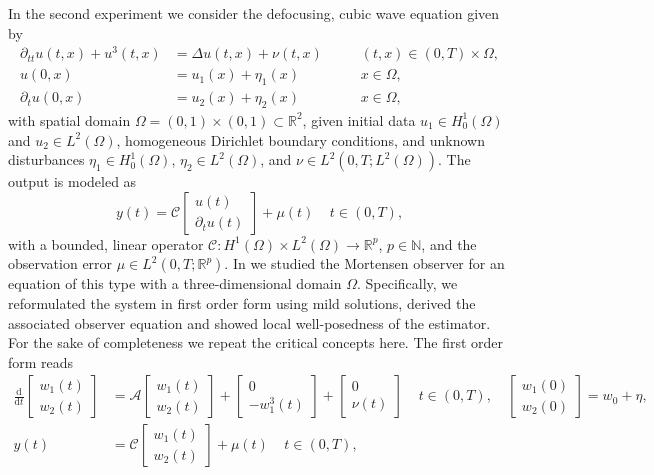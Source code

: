 \documentclass[11pt,reqno]{amsart}
\numberwithin{equation}{section}
\theoremstyle{plain}
\begin{document}
In the second experiment we consider the defocusing, cubic wave equation given by 
%
\begin{equation*}
\begin{aligned}
	\partial_{tt} {u}(t,x) + {u}^3(t,x) &= \Delta {u}(t,x) + \nu(t,x)
	~~~~~&&(t,x) \in (0,T) \times \Omega, \\
	{u}(0,x) &= u_1(x) + \eta_1(x)
	~~~~~&&x \in \Omega,\\
	\partial_t {u}(0,x) &= u_2(x) + \eta_2(x)
	~~~~~&&x \in \Omega,
\end{aligned}
\end{equation*}
%
with  spatial domain $\Omega = (0,1) \times (0,1) \subset \mathbb{R}^2$, given initial data $u_1 \in H^1_0(\Omega)$ and $u_2 \in L^2(\Omega)$, homogeneous Dirichlet boundary conditions, and unknown disturbances $\eta_1 \in H^1_0(\Omega)$, $\eta_2 \in L^2(\Omega)$, and $\nu \in L^2(0,T;L^2(\Omega))$. The output is modeled as 
%
\begin{equation*}
	y(t) = \mathcal{C} \begin{bmatrix} u(t) \\ \partial_t u(t) \end{bmatrix}
	+ \mu(t)
	~~~~~ t \in (0,T), 
\end{equation*}
%
with a bounded, linear operator $\mathcal{C} \colon H^1(\Omega) \times L^2(\Omega) \to \mathbb{R}^p$, $p \in \mathbb{N}$, and the observation error $\mu \in L^2(0,T;\mathbb{R}^p)$.
In \cite{Sch24} we studied the Mortensen observer for an equation of this type with a three-dimensional domain $\Omega$. Specifically, we reformulated the system in first order form using mild solutions, derived the associated observer equation and showed local well-posedness of the estimator.
For the sake of completeness we repeat the critical concepts here. The first order form reads
%
\begin{equation}\label{eq: waveNum}
	\begin{aligned}
		\frac{\mathrm{d}}{\mathrm{d}t} \begin{bmatrix} w_1(t) \\ w_2(t) \end{bmatrix}
		&=
		\mathcal{A}
		\begin{bmatrix} w_1(t) \\ w_2(t) \end{bmatrix}
		+
		\begin{bmatrix} 0 \\ - w_1^3(t) \end{bmatrix}
		+ \begin{bmatrix} 0 \\ \nu(t) \end{bmatrix}
		~~~~~ t \in (0,T),
		\quad
		\begin{bmatrix} w_1(0) \\ w_2(0) \end{bmatrix}
		= w_0 + \eta,\\
		y(t) &= \mathcal{C} \begin{bmatrix} w_1(t) \\ w_2(t) \end{bmatrix} + \mu(t) 
		~~~~~ t \in (0,T),
	\end{aligned}
\end{equation}
\end{document}

